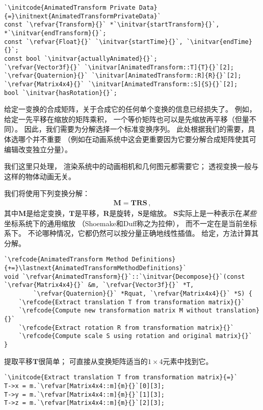 \begin{lstlisting}
`\initcode{AnimatedTransform Private Data}{=}\initnext{AnimatedTransformPrivateData}`
const `\refvar{Transform}{}` *`\initvar{startTransform}{}`, *`\initvar{endTransform}{}`;
const `\refvar{Float}{}` `\initvar{startTime}{}`, `\initvar{endTime}{}`;
const bool `\initvar{actuallyAnimated}{}`;
`\refvar{Vector3f}{}` `\initvar[AnimatedTransform::T]{T}{}`[2];
`\refvar{Quaternion}{}` `\initvar[AnimatedTransform::R]{R}{}`[2];
`\refvar{Matrix4x4}{}` `\initvar[AnimatedTransform::S]{S}{}`[2];
bool `\initvar{hasRotation}{}`;
\end{lstlisting}

给定一变换的合成矩阵，关于合成它的任何单个变换的信息已经损失了。
例如，给定一先平移在缩放的矩阵乘积，
一个等价矩阵也可以是先缩放再平移（但量不同）。
因此，我们需要为分解选择一个标准变换序列。
此处根据我们的需要，具体选哪个并不重要
（例如在动画系统中这会更重要因为它要分解合成矩阵使其可编辑改变独立分量）。

我们这里只处理，
渲染系统中的动画相机和几何图元都需要它；
透视变换一般与这样的物体动画无关。

我们将使用下列变换分解：
\begin{align}\label{eq:2.9}
    \bm M=\bm T\bm R\bm S\, ,
\end{align}
其中$\bm M$是给定变换，$\bm T$是平移，$\bm R$是旋转，$\bm S$是缩放。
$\bm S$实际上是一种表示在\emph{某些}坐标系统下的通用缩放
（Shoemake和Duff称之为拉伸），
而不一定在是当前坐标系下。
不论哪种情况，它都仍然可以按分量正确地线性插值。
给定，方法计算其分解。
\begin{lstlisting}
`\refcode{AnimatedTransform Method Definitions}{+=}\lastnext{AnimatedTransformMethodDefinitions}`
void `\refvar{AnimatedTransform}{}`::`\initvar{Decompose}{}`(const `\refvar{Matrix4x4}{}` &m, `\refvar{Vector3f}{}` *T,
        `\refvar{Quaternion}{}` *Rquat, `\refvar{Matrix4x4}{}` *S) {
    `\refcode{Extract translation T from transformation matrix}{}`
    `\refcode{Compute new transformation matrix M without translation}{}`
    `\refcode{Extract rotation R from transformation matrix}{}`
    `\refcode{Compute scale S using rotation and original matrix}{}`
}
\end{lstlisting}

提取平移$\bm T$很简单；
可直接从变换矩阵适当的$1\times4$元素中找到它。
\begin{lstlisting}
`\initcode{Extract translation T from transformation matrix}{=}`
T->x = m.`\refvar[Matrix4x4::m]{m}{}`[0][3];
T->y = m.`\refvar[Matrix4x4::m]{m}{}`[1][3];
T->z = m.`\refvar[Matrix4x4::m]{m}{}`[2][3];
\end{lstlisting}

